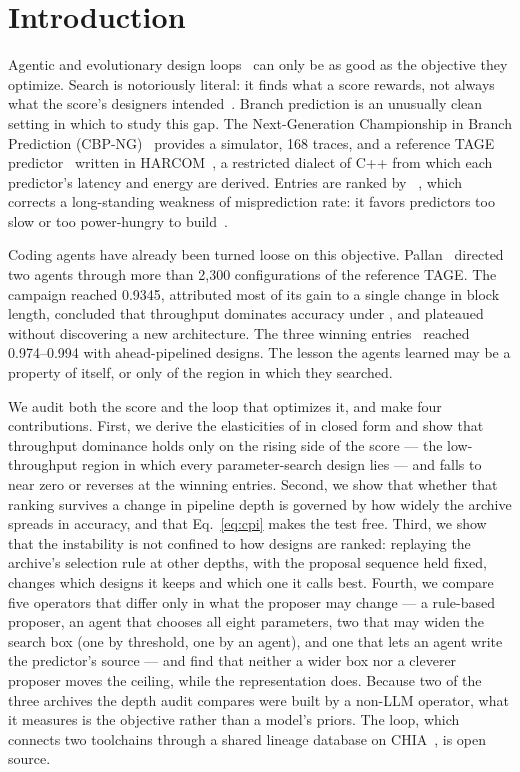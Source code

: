 \documentclass[conference]{IEEEtran}
\newcommand{\vfs}{\text{VFS}}
\begin{document}
\section{Introduction}

Agentic and evolutionary design loops~\cite{alphaevolve,funsearch,elm,archgym}
can only be as good as the objective they optimize. Search is notoriously
literal: it finds what a score rewards, not always what the score's designers
intended~\cite{lehman2020surprising,amodei2016concrete}. Branch prediction is an
unusually clean setting in which to study this gap. The Next-Generation
Championship in Branch Prediction (CBP-NG)~\cite{cbpng} provides a simulator,
168 traces, and a reference TAGE predictor~\cite{seznec2006tage,seznec2011tage}
written in HARCOM~\cite{harcom}, a restricted dialect of C++ from which each
predictor's latency and energy are derived. Entries are ranked by
\vfs{}~\cite{vfsmetric}, which corrects a long-standing weakness of misprediction
rate: it favors predictors too slow or too power-hungry to
build~\cite{jimenez2000delay,jimenez2003reconsidering}.

Coding agents have already been turned loose on this objective.
Pallan~\cite{pallan} directed two agents through more than 2,300 configurations
of the reference TAGE. The campaign reached 0.9345, attributed most of its gain
to a single change in block length, concluded that throughput dominates accuracy
under \vfs{}, and plateaued without discovering a new architecture. The three
winning entries~\cite{koizumi,fan,dang} reached 0.974--0.994 with
ahead-pipelined designs. The lesson the agents learned may be a property of
\vfs{} itself, or only of the region in which they searched.

We audit both the score and the loop that optimizes it, and make four
contributions. First, we derive the elasticities of \vfs{} in closed form and
show that throughput dominance holds only on the rising side of the score ---
the low-throughput region in which every parameter-search design lies --- and
falls to near zero or reverses at the winning entries. Second, we show that whether that ranking
survives a change in pipeline depth is governed by how widely the archive
spreads in accuracy, and that Eq.~\eqref{eq:cpi} makes the test free.
Third, we show that the instability is not confined to how designs are ranked:
replaying the archive's selection rule at other depths, with the proposal
sequence held fixed, changes which designs it keeps and which one it calls
best. Fourth, we compare five operators that differ only in what the proposer
may change --- a rule-based proposer, an agent that chooses all eight
parameters, two that may widen the search box (one by threshold, one by an
agent), and one that lets an agent write the predictor's source --- and find
that neither a wider box nor a cleverer proposer moves the ceiling, while the
representation does. Because two of the three archives the depth audit compares
were built by a non-LLM operator, what it measures is the objective rather than
a model's priors. The loop, which connects two
toolchains through a shared lineage database on CHIA~\cite{chia}, is open source.
\end{document}
